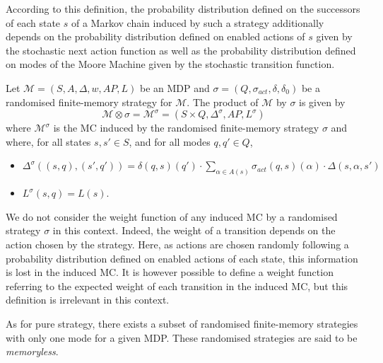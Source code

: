 According to this definition, the probability distribution defined on the successors of each state $s$ of a Markov chain induced by such a strategy additionally depends on the probability distribution defined on enabled actions of $s$ given by the stochastic next action function as well as the probability distribution defined on modes of the Moore Machine given by the stochastic transition function.

\begin{definition}
  Let $\mathcal{M}=(S, A, \Delta, w, AP, L)$ be an MDP and $\sigma=(Q, \sigma_{act}, \delta, \delta_0)$ be a randomised finite-memory strategy for $\mathcal{M}$.
  The product of $\mathcal{M}$ by $\sigma$ is given by
  \[
    \mathcal{M} \otimes \sigma = \mathcal{M}^\sigma = (S \times Q, \Delta^\sigma, AP, L^\sigma)
  \]
  where $\mathcal{M}^\sigma$ is the MC induced by the randomised finite-memory strategy $\sigma$ and where, for all states $s, s' \in S$, and for all modes $q, q' \in Q$,
  \begin{itemize}
    \item $\Delta^\sigma((s, q), (s', q')) =
    \delta(q, s)(q') \cdot \sum_{\alpha \in A(s)} \sigma_{act}(q, s)(\alpha) \cdot \Delta(s, \alpha, s')$
    \item $L^\sigma(s, q) = L(s)$.
  \end{itemize}
\end{definition}

\begin{remark}
  We do not consider the weight function of any induced MC by a randomised strategy $\sigma$ in this context.
  Indeed, the weight of a transition depends on the action chosen by the strategy. Here, as actions are chosen randomly following a probability distribution defined on enabled actions of each state, this information is lost in the induced MC.
  It is however possible to define a weight function
  referring to the expected weight of each transition in the induced MC, but this definition is irrelevant in this context.
\end{remark}

As for pure strategy, there exists a subset of randomised finite-memory strategies with only one mode for a given MDP.
These randomised strategies are said to be \textit{memoryless}.

